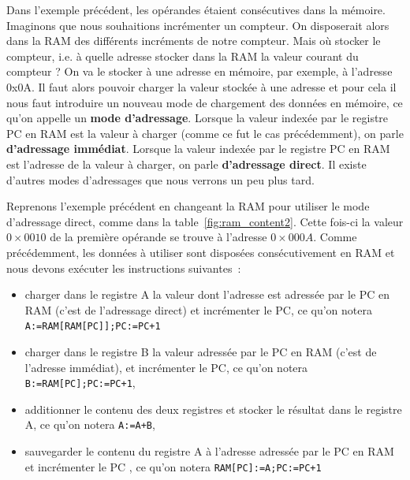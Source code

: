 Dans l'exemple précédent, les opérandes étaient consécutives dans la mémoire. Imaginons que nous souhaitions incrémenter un compteur. On disposerait alors dans la RAM des différents incréments de notre compteur. Mais o{\`u} stocker le compteur, i.e. à quelle adresse stocker dans la RAM la valeur courant du compteur ? On va le stocker à une adresse en mémoire, par exemple, à l'adresse 0x0A. Il faut alors pouvoir charger la valeur stockée à une adresse et pour cela il nous faut introduire un nouveau mode de chargement des données en mémoire, ce qu'on appelle un \textbf{mode d'adressage}. Lorsque la valeur indexée par le registre PC en RAM est la valeur à charger (comme ce fut le cas précédemment), on parle \textbf{d'adressage immédiat}. Lorsque la valeur indexée par le registre PC en RAM est l'adresse de la valeur à charger, on parle \textbf{d'adressage direct}. Il existe d'autres modes d'adressages que nous verrons un peu plus tard.

Reprenons l'exemple précédent en changeant la RAM pour utiliser le mode d'adressage direct, comme dans la table~\ref{fig:ram_content2}. Cette fois-ci la valeur $0\times0010$ de la première opérande se trouve à l'adresse $0\times000A$. Comme précédemment, les données à utiliser sont disposées consécutivement en RAM et nous devons exécuter les instructions suivantes~:
\begin{itemize}
\item charger dans le registre A la valeur dont l'adresse est adressée par le PC en RAM (c'est de l'adressage direct) et incrémenter le PC, ce qu'on notera \texttt{A:=RAM[RAM[PC]];PC:=PC+1}
\item charger dans le registre B la valeur adressée par le PC en RAM (c'est de l'adresse immédiat), et incrémenter le PC, ce qu'on notera \texttt{B:=RAM[PC];PC:=PC+1},
\item additionner le contenu des deux registres et stocker le résultat dans le registre A, ce qu'on notera \texttt{A:=A+B},
\item sauvegarder le contenu du registre A à l'adresse adressée par le PC en RAM et incrémenter le PC , ce qu'on notera \texttt{RAM[PC]:=A;PC:=PC+1}
\end{itemize}

